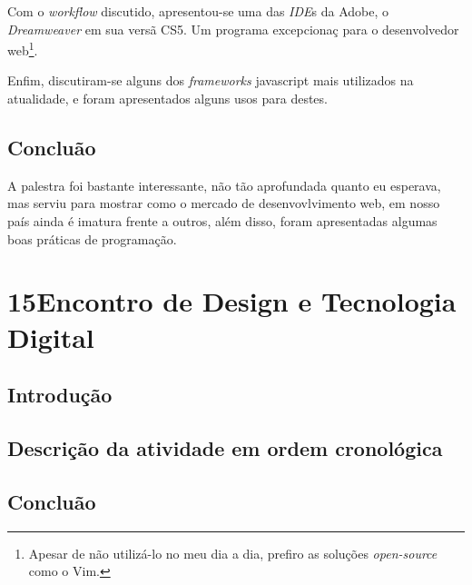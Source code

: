 \documentclass[a4paper,12pt]{report}
\begin{document}
        Com o \emph{workflow} discutido, apresentou-se uma das \emph{IDE}s da
        Adobe, o \emph{Dreamweaver} em sua vers\~{a} CS5. Um programa excepcionaç
        para o desenvolvedor web\footnote{Apesar de n\~{a}o utiliz\'{a}-lo no meu
        dia a dia, prefiro as solu\c{c}\~{o}es \emph{open-source} como o Vim.}.

        Enfim, discutiram-se alguns dos \emph{frameworks} javascript mais
        utilizados na atualidade, e foram apresentados alguns usos para destes.

        \section{Conclu\~{a}o}

        A palestra foi bastante interessante, n\~{a}o t\~{a}o aprofundada quanto
        eu esperava, mas serviu para mostrar como o mercado de desenvovlvimento
        web, em nosso pa\'{i}s ainda \'{e} imatura frente a outros, al\'{e}m
        disso, foram apresentadas algumas boas pr\'{a}ticas de programa\c{c}\~{a}o.

    \chapter[15\textordmasculine EDTED]{15\textordmasculine Encontro de Design e
    Tecnologia Digital}

        \section{Introdu\c{c}\~{a}o}

        \section[Descri\c{c}\~{a}o atividade]{Descri\c{c}\~{a}o da atividade em
        ordem cronol\'{o}gica}

        \section{Conclu\~{a}o}
\end{document}
